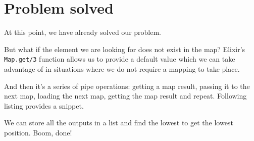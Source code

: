 \section{Problem solved}
At this point, we have already solved our problem. 

But what if the element we are looking for does not exist in the map? Elixir's \texttt{Map.get/3} function allows us to provide a default value which we can take advantage of in situations where we do not require a mapping to take place.

And then it's a series of pipe operations: getting a map result, passing it to the next map, loading the next map, getting the map result and repeat. Following listing provides a snippet.



We can store all the outputs in a list and find the lowest to get the lowest position. Boom, done!